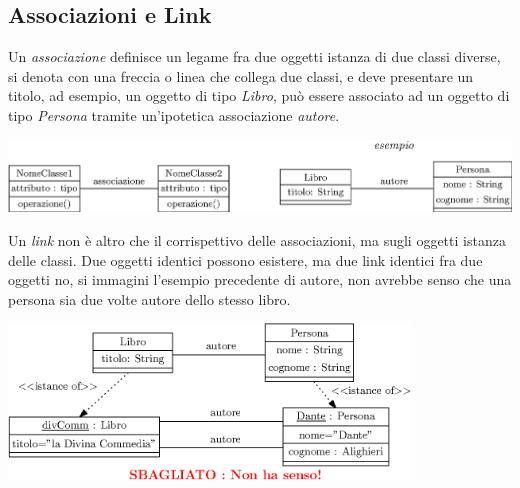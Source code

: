\documentclass[12pt, letterpaper]{article}
\begin{document}
\subsection{Associazioni e Link}
Un \textit{associazione} definisce un legame fra due oggetti istanza di due classi diverse, si denota con una freccia o linea che collega due classi, 
e deve presentare un titolo, ad esempio, un oggetto di tipo \textit{Libro}, può essere associato ad un oggetto 
di tipo \textit{Persona} tramite un'ipotetica associazione \textit{autore}.\begin{center}
    \includegraphics[width=\textwidth ]{images/associazione.eps}
\end{center}
Un \textit{link} non è altro che il corrispettivo delle associazioni, ma sugli oggetti istanza delle classi. Due oggetti 
identici possono esistere, ma due link identici fra due oggetti no, si immagini l'esempio precedente di autore, 
non avrebbe senso che una persona sia due volte autore dello stesso libro.\begin{center}
    \includegraphics[width=0.8\textwidth ]{images/2link.eps}
\end{center}
\end{document}
